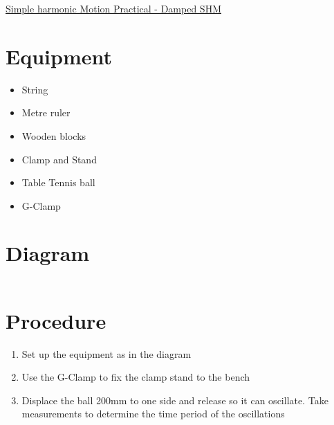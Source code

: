 \documentclass{article}[18pt]
\begin{document}
\begin{center}
\underline{\huge Simple harmonic Motion Practical - Damped SHM}
\end{center}
\section{Equipment}
\begin{itemize}
\item String
\item Metre ruler
\item Wooden blocks
\item Clamp and Stand
\item Table Tennis ball
\item G-Clamp
\end{itemize}
\section{Diagram}
$ $\\
\section{Procedure}
\begin{enumerate}
\item Set up the equipment as in the diagram
\item Use the G-Clamp to fix the clamp stand to the bench
\item Displace the ball 200mm to one side and release so it can oscillate. Take measurements to determine the time period of the oscillations
\end{enumerate}
\end{document}
